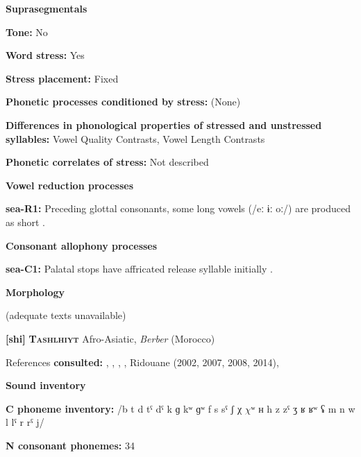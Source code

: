 \textbf{Suprasegmentals}



\textbf{Tone:} No



\textbf{Word stress:} Yes



\textbf{Stress placement:} Fixed



\textbf{Phonetic processes conditioned by stress:} (None)



\textbf{Differences in phonological properties of stressed and unstressed syllables:} Vowel Quality Contrasts, Vowel Length Contrasts



\textbf{Phonetic correlates of stress:} Not described



\textbf{Vowel reduction processes}



\textbf{sea-R1:} Preceding glottal consonants, some long vowels (/eː ɨː oː/) are produced as short \citep[10-11]{Philips2007}.



\textbf{Consonant allophony processes}



\textbf{sea-C1:} Palatal stops have affricated release syllable initially \citep[5]{Philips2007}.



\textbf{Morphology}



(adequate texts unavailable)



\textbf{[shi]}   \textbf{\textsc{Tashlhiyt}}  Afro-Asiatic, \textit{Berber} (Morocco)



References \textbf{consulted:} \citet{Coleman2001}, \citet{DellElmedlaoui2002}, \citet{GordonNafi2012}, \citet{LoualiPuech1999}, Ridouane (2002, 2007, 2008, 2014), \citet{RoettgerEtAl2015}



\textbf{Sound inventory}



\textbf{C phoneme inventory:} /b t d tˤ dˤ k ɡ kʷ ɡʷ f s sˤ ʃ χ $\chi ʷ$ ʜ h z zˤ ʒ ʁ ʁʷ ʢ m n w l lˤ r rˤ j/



\textbf{N consonant phonemes:} 34



